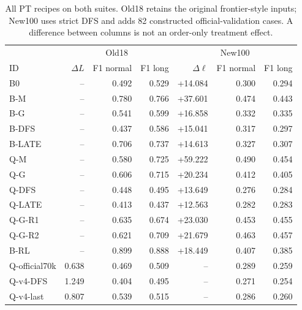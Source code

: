 \begin{table}[htbp]\centering\small
\caption{All PT recipes on both suites. Old18 retains the original frontier-style inputs; New100 uses strict DFS and adds 82 constructed official-validation cases. A difference between columns is not an order-only treatment effect.}\label{tab:all}
\setlength{\tabcolsep}{3.5pt}
\begin{tabular}{@{}lrrrrrr@{}}\toprule
 & \multicolumn{3}{c}{Old18} & \multicolumn{3}{c}{New100} \\
ID & $\Delta L$ & F1 normal & F1 long & $\Delta\ell$ & F1 normal & F1 long \\ \midrule
B0 & -- & 0.492 & 0.529 & +14.084 & 0.300 & 0.294 \\
B-M & -- & 0.780 & 0.766 & +37.601 & 0.474 & 0.443 \\
B-G & -- & 0.541 & 0.599 & +16.858 & 0.332 & 0.335 \\
B-DFS & -- & 0.437 & 0.586 & +15.041 & 0.317 & 0.297 \\
B-LATE & -- & 0.706 & 0.737 & +14.613 & 0.327 & 0.307 \\
Q-M & -- & 0.580 & 0.725 & +59.222 & 0.490 & 0.454 \\
Q-G & -- & 0.606 & 0.715 & +20.234 & 0.412 & 0.405 \\
Q-DFS & -- & 0.448 & 0.495 & +13.649 & 0.276 & 0.284 \\
Q-LATE & -- & 0.413 & 0.437 & +12.563 & 0.282 & 0.283 \\
Q-G-R1 & -- & 0.635 & 0.674 & +23.030 & 0.453 & 0.455 \\
Q-G-R2 & -- & 0.621 & 0.709 & +21.679 & 0.463 & 0.457 \\
B-RL & -- & 0.899 & 0.888 & +18.449 & 0.407 & 0.385 \\
Q-official70k & 0.638 & 0.469 & 0.509 & -- & 0.289 & 0.259 \\
Q-v4-DFS & 1.249 & 0.404 & 0.495 & -- & 0.271 & 0.254 \\
Q-v4-last & 0.807 & 0.539 & 0.515 & -- & 0.286 & 0.260 \\
\bottomrule\end{tabular}\end{table}
